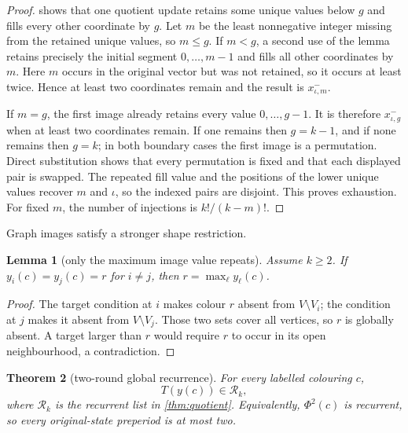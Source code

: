 \documentclass[11pt,a4paper]{amsart}
\newtheorem{theorem}{Theorem}[section]
\newtheorem{lemma}[theorem]{Lemma}
\theoremstyle{definition}
\theoremstyle{remark}
\newcommand{\PhiG}{\Phi}
\newcommand{\Rec}{\mathcal R}
\begin{document}
\begin{proof}
 shows that one quotient update retains some unique
values below \(g\) and fills every other coordinate by \(g\).  Let \(m\) be
the least nonnegative integer missing from the retained unique values, so
\(m\le g\).  If \(m<g\), a second use of the lemma retains precisely the
initial segment \(0,\ldots,m-1\) and fills all other coordinates by \(m\).
Here \(m\) occurs in the original vector but was not retained, so it occurs
at least twice.  Hence at least two coordinates remain and the result is
\(x^-_{\iota,m}\).

If \(m=g\), the first image already retains every value
\(0,\ldots,g-1\).  It is therefore \(x^-_{\iota,g}\) when at least two
coordinates remain.  If one remains then \(g=k-1\), and if none remains then
\(g=k\); in both boundary cases the first image is a permutation.  Direct
substitution shows that every permutation is fixed and that each displayed
pair is swapped.  The repeated fill value and the positions of the lower
unique values recover \(m\) and \(\iota\), so the indexed pairs are
disjoint.  This proves exhaustion.  For fixed \(m\), the number of injections
is \(k!/(k-m)!\).
\end{proof}

Graph images satisfy a stronger shape restriction.

\begin{lemma}[only the maximum image value repeats]\label{lem:maxrepeat}
Assume \(k\ge2\).  If \(y_i(c)=y_j(c)=r\) for \(i\ne j\), then
\(r=\max_\ell y_\ell(c)\).
\end{lemma}

\begin{proof}
The target condition at \(i\) makes colour \(r\) absent from
\(V\setminus V_i\); the condition at \(j\) makes it absent from
\(V\setminus V_j\).  Those two sets cover all vertices, so \(r\) is globally
absent.  A target larger than \(r\) would require \(r\) to occur in its open
neighbourhood, a contradiction.
\end{proof}

\begin{theorem}[two-round global recurrence]\label{thm:two-round}
For every labelled colouring \(c\),
\[
                         T(y(c))\in\Rec_k,
\]
where \(\Rec_k\) is the recurrent list in \cref{thm:quotient}.  Equivalently,
\(\PhiG^2(c)\) is recurrent, so every original-state preperiod is at most
two.
\end{theorem}
\end{document}
